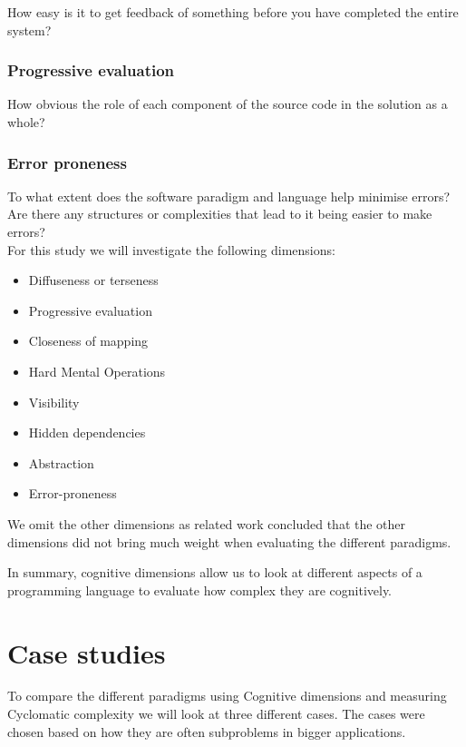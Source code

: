 \documentclass[12pt]{report}
\theoremstyle{definition}
\theoremstyle{theorem}
\begin{document}
How easy is it to get feedback of something before you have completed the entire
system?

\subsubsection*{Progressive evaluation}

How obvious the role of each component of the source code in the solution as a
whole?

\subsubsection*{Error proneness}

To what extent does the software paradigm and language help minimise errors? Are
there any structures or complexities that lead to it being easier to make
errors?~\cite{GREEN1996131}\\

\noindent For this study we will investigate the following dimensions: 

\begin{itemize}
    \item Diffuseness or terseness
    \item Progressive evaluation
    \item Closeness of mapping
    \item Hard Mental Operations
    \item Visibility
    \item Hidden dependencies
    \item Abstraction
    \item Error-proneness 
\end{itemize}

\noindent We omit the other dimensions as related work concluded that the other
dimensions did not bring much weight when evaluating the different
paradigms.~\cite{euguenkiss}

In summary, cognitive dimensions allow us to look at different aspects of a
programming language to evaluate how complex they are cognitively. 

\section{Case studies}

To compare the different paradigms using Cognitive dimensions and measuring
Cyclomatic complexity we will look at three different cases. The cases were
chosen based on how they are often subproblems in bigger applications.
\end{document}
